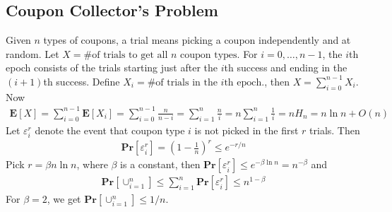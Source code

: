 \documentclass[12pt]{article}
\begin{document}
\subsection*{Coupon Collector's Problem}
Given $n$ types of coupons, a trial means picking a coupon independently and at random. Let $X = \text{\# of trials to get all } n \text{ coupon types}$. For $i=0, \hdots, n-1$, the $i$th epoch consists of the trials starting just after the $i$th success and ending in the $(i+1)$th success. Define $X_i = \text{\# of trials in the } i\text{th epoch.}$, then $X=\sum_{i=0}^{n-1} X_i$. Now
\begin{align*}
\mathbf{E}\left[ X \right] = \sum_{i=0}^{n-1} \mathbf{E}\left[ X_i \right] = \sum_{i=0}^{n-1} \frac{n}{n-i} = \sum_{i=1}^{n} \frac{n}{i} =  n \sum_{i=1}^{n} \frac{1}{i} = n H_{n} = n \ln n + O(n)
\end{align*}
Let $\varepsilon_i^r$ denote the event that coupon type $i$ is not picked in the first $r$ trials. Then
\begin{align*}
\mathbf{Pr}\left[ \varepsilon_i^r \right] = \left(1-\frac{1}{n}\right)^r \leq e^{-r/n}
\end{align*}
Pick $r=\beta n \ln n$, where $\beta$ is a constant, then $\mathbf{Pr}\left[ \varepsilon_i^r \right] \leq e^{-\beta \ln n} = n^{-\beta}$ and
\begin{align*}
\mathbf{Pr}\left[ \cup_{i=1}^n \right] \leq \sum_{i=1}^n \mathbf{Pr}\left[ \varepsilon_i^r \right] \leq n^{1-\beta}
\end{align*}
For $\beta=2$, we get $\mathbf{Pr}\left[ \cup_{i=1}^n \right] \leq 1/n$.
\end{document}
